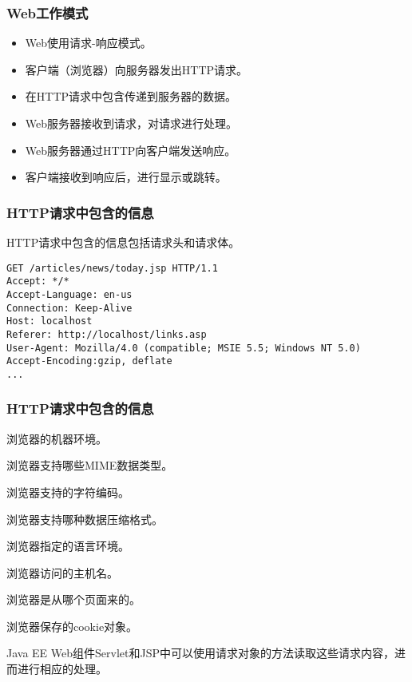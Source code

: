 \begin{frame}[fragile] %
\frametitle{Web工作模式} 
\begin{itemize}\kai
\item Web使用请求-响应模式。
\item 客户端（浏览器）向服务器发出HTTP请求。
\item 在HTTP请求中包含传递到服务器的数据。
\item Web服务器接收到请求，对请求进行处理。
\item Web服务器通过HTTP向客户端发送响应。
\item 客户端接收到响应后，进行显示或跳转。
\end{itemize}
\end{frame}

\begin{frame} %
\frametitle{HTTP请求中包含的信息} 

HTTP请求中包含的信息包括请求头和请求体。


{\small
\begin{verbatim}
GET /articles/news/today.jsp HTTP/1.1 
Accept: */*
Accept-Language: en-us 
Connection: Keep-Alive 
Host: localhost
Referer: http://localhost/links.asp
User-Agent: Mozilla/4.0 (compatible; MSIE 5.5; Windows NT 5.0)
Accept-Encoding:gzip, deflate
... 
\end{verbatim}
}
\end{frame}

\begin{frame}[fragile] %
\frametitle{HTTP请求中包含的信息} 

\begin{description}\kai
\item[User-Agent] 浏览器的机器环境。
\item[Accept] 浏览器支持哪些MIME数据类型。
\item[Accept-Charset] 浏览器支持的字符编码。
\item[Accept-Encoding] 浏览器支持哪种数据压缩格式。
\item[Accept-Language] 浏览器指定的语言环境。
\item[Host] 浏览器访问的主机名。
\item[Referer] 浏览器是从哪个页面来的。
\item[Cookie] 浏览器保存的cookie对象。
\end{description}

Java EE Web组件Servlet和JSP中可以使用请求对象的方法读取这些请求内容，进而进行相应的处理。

\end{frame}

